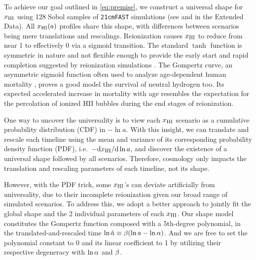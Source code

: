 To achieve our goal outlined in \cref{eq:premise}, we construct a
universal shape for $x_{\mathrm{HI}}$ using 128 Sobol samples of \texttt{21cmFAST} simulations
(see  and  in the Extended Data).
All $x_{\mathrm{HI}}(a)$ profiles share this shape, with differences between
scenarios being mere translations and rescalings.
Reionization causes $x_{\mathrm{HI}}$ to reduce from near 1 to effectively 0 via a
sigmoid transition.
The standard $\tanh$ function is symmetric in nature and not flexible
enough to provide the early start and rapid completion suggested by
reionization simulations \cite{Trac2018, Doussot2019}.
The Gompertz curve, an asymmetric sigmoid function often used to analyze
age-dependent human mortality \cite{Gompertz1825}, proves a good model
the survival of neutral hydrogen too.
Its expected accelerated increase in mortality with age resembles the
expectation for the percolation of ionized HII bubbles during the end
stages of reionization.

One way to uncover the universality is to view each $x_{\mathrm{HI}}$ scenario as
a cumulative probability distribution (CDF) in $- \ln a$.
With this insight, we can translate and rescale each timeline using the
mean and variance of its corresponding probability density function
(PDF), i.e.\ $- \mathrm{d}x_{\mathrm{HI}} / \mathrm{d}\ln a$, and discover the
existence of a universal shape followed by all scenarios.
Therefore, cosmology only impacts the translation and rescaling
parameters of each timeline, not its shape.

However, with the PDF trick, some $x_{\mathrm{HI}}$'s can deviate artificially
from universality, due to their incomplete reionization given our broad
range of simulated scenarios.
To address this, we adopt a better approach to jointly fit the global
shape and the 2 individual parameters of each $x_{\mathrm{HI}}$.
Our shape model constitutes the Gompertz function composed with a
5th-degree polynomial, in the translated-and-rescaled time $\ln\tilde{a}
\equiv \beta (\ln a - \ln\alpha)$.
And we are free to set the polynomial constant to 0 and its linear
coefficient to 1 by utilizing their respective degeneracy with $\ln\alpha$
and $\beta$.

